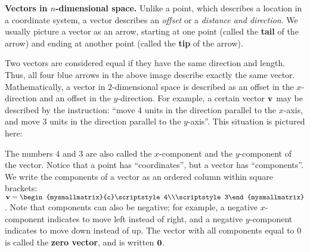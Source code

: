 \noindent\textbf{Vectors in $n$-dimensional space.}
Unlike a point, which describes a location in a coordinate system, a
vector describes an {\em
  offset} or a {\em distance and direction}. We usually
picture a vector as an arrow, starting at one point (called the
\textbf{tail} of the arrow) and ending
at another point 
(called the \textbf{tip} of the arrow).
\begin{center}
\end{center}
Two vectors are considered equal if they have the same direction and
length. Thus, all four blue arrows in the above image describe exactly
the same vector. Mathematically, a vector in $2$-dimensional space is
described as an offset in the $x$-direction and an offset in the
$y$-direction.  For example, a certain vector $\mbox{\bf v}$ may be
described by the instruction: ``move $4$ units in the direction
parallel to the $x$-axis, and move $3$ units in the direction parallel
to the $y$-axis''. This situation is pictured here:
\begin{center}
\end{center}
The numbers $4$ and $3$ are also called the
$x$-component and the $y$-component of
the vector. Notice that a point has ``coordinates'', but a vector has
``components''. We write the components of a vector as an ordered
column within square brackets:
$\vect{v}=\begin{mysmallmatrix}{c}\scriptstyle4\\\scriptstyle3\end{mysmallmatrix}$. Note
that components can also be negative; for example, a negative
$x$-component indicates to move left instead of right, and a negative
$y$-component indicates to move down instead of up. The vector with
all components equal to $0$ is called the \textbf{zero
  vector}, and is written $\mbox{\bf 0}$. 


